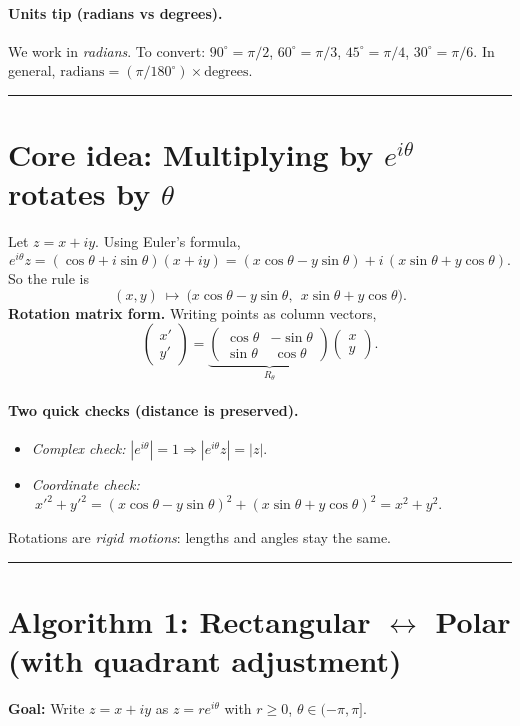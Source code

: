 \documentclass[11pt]{article}
\begin{document}
\paragraph{Units tip (radians vs degrees).} We work in \emph{radians}. To convert: \(90^\circ=\pi/2\), \(60^\circ=\pi/3\), \(45^\circ=\pi/4\), \(30^\circ=\pi/6\). In general, \(\text{radians}=(\pi/180^\circ)\times\text{degrees}\).

\bigskip
\hrule
\bigskip

\section*{Core idea: Multiplying by \(e^{i\theta}\) rotates by \(\theta\)}
Let \(z=x+iy\). Using Euler’s formula,
\[
e^{i\theta}z=(\cos\theta+i\sin\theta)(x+iy)
=(x\cos\theta - y\sin\theta) + i\, (x\sin\theta + y\cos\theta).
\]
So the rule is
\[
(x,y)\ \mapsto\ \bigl(x\cos\theta - y\sin\theta,\ \ x\sin\theta + y\cos\theta\bigr).
\]
\textbf{Rotation matrix form.} Writing points as column vectors,
\[
\begin{pmatrix}x'\\y'\end{pmatrix}
=
\underbrace{\begin{pmatrix}
\cos\theta & -\sin\theta\\
\sin\theta & \ \cos\theta
\end{pmatrix}}_{\displaystyle R_\theta}
\begin{pmatrix}x\\y\end{pmatrix}.
\]

\paragraph{Two quick checks (distance is preserved).}
\begin{itemize}
  \item \emph{Complex check:} \(|e^{i\theta}|=1\Rightarrow |e^{i\theta}z|=|z|\).
  \item \emph{Coordinate check:}
  \(\ {x'}^2+{y'}^2=(x\cos\theta-y\sin\theta)^2+(x\sin\theta+y\cos\theta)^2=x^2+y^2\).
\end{itemize}
Rotations are \emph{rigid motions}: lengths and angles stay the same.

\bigskip
\hrule
\bigskip

\section*{Algorithm 1: Rectangular \(\leftrightarrow\) Polar (with quadrant adjustment)}
\textbf{Goal:} Write \(z=x+iy\) as \(z=re^{i\theta}\) with \(r\ge0\), \(\theta\in(-\pi,\pi]\).
\end{document}
